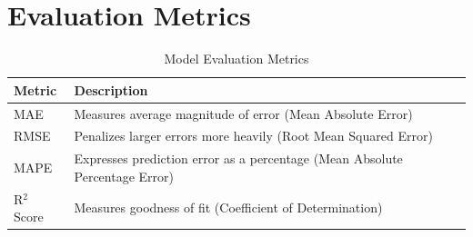 \section{Evaluation Metrics}

\begin{table}[h!]
    \centering
    \caption{Model Evaluation Metrics}
    \label{tab:metrics}
    \begin{tabular}{|l|p{7cm}|}
        \hline
        \textbf{Metric} & \textbf{Description} \\
        \hline
        MAE & Measures average magnitude of error (Mean Absolute Error) \\
        \hline
        RMSE & Penalizes larger errors more heavily (Root Mean Squared Error) \\
        \hline
        MAPE & Expresses prediction error as a percentage (Mean Absolute Percentage Error) \\
        \hline
        R$^2$ Score & Measures goodness of fit (Coefficient of Determination) \\
        \hline
    \end{tabular}
\end{table}